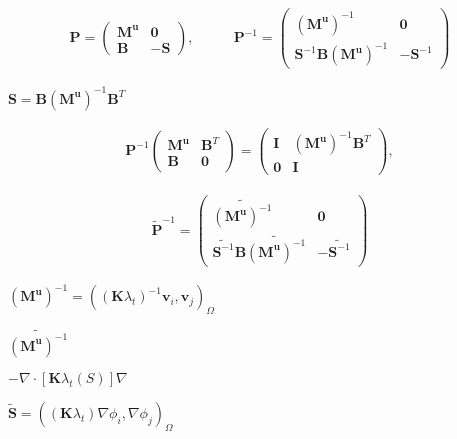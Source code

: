 \documentclass{article}
\begin{document}
\begin{align*} \mathbf{P} = \left( \begin{array}{cc} \mathbf{M}^{\mathbf{u}} & \mathbf{0} \\ \mathbf{B} & -\mathbf{S} \end{array} \right), & \qquad \mathbf{P}^{-1} = \left( \begin{array}{cc} \left(\mathbf{M}^{\mathbf{u}}\right)^{-1} & \mathbf{0} \\ \mathbf{S}^{-1} \mathbf{B} \left(\mathbf{M}^{\mathbf{u}}\right)^{-1} & -\mathbf{S}^{-1} \end{array} \right) \end{align*}
\pagebreak

$\mathbf{S}=\mathbf{B}\left(\mathbf{M}^{\mathbf{u}}\right)^{-1}\mathbf{B}^T$
\pagebreak

\begin{align*} \mathbf{P}^{-1} \left( \begin{array}{cc} \mathbf{M}^{\mathbf{u}} & \mathbf{B}^{T} \\ \mathbf{B} & \mathbf{0} \end{array} \right) = \left( \begin{array}{cc} \mathbf{I} & \left(\mathbf{M}^{\mathbf{u}}\right)^{-1} \mathbf{B}^{T} \\ \mathbf{0} & \mathbf{I} \end{array} \right), \end{align*}
\pagebreak

\begin{align*} \mathbf{\tilde{P}}^{-1} = \left( \begin{array}{cc} \widetilde{\left(\mathbf{{M}}^{\mathbf{u}}\right)^{-1}} & \mathbf{0} \\ \widetilde{\mathbf{{S}}^{-1}} \mathbf{B} \widetilde{\left(\mathbf{{M}}^{\mathbf{u}}\right)^{-1}} & -\widetilde{\mathbf{{S}}^{-1}} \end{array} \right) \end{align*}
\pagebreak

$\left(\mathbf{{M}}^{\mathbf{u}}\right)^{-1}=\left( \left( \mathbf{K} \lambda_t \right)^{-1} \mathbf{v}_{i},\mathbf{v}_{j}\right)_{\Omega}$
\pagebreak

$\widetilde{\left(\mathbf{{M}}^{\mathbf{u}}\right)^{-1}}$
\pagebreak

$-\nabla \cdot [\mathbf K \lambda_t(S)]\nabla$
\pagebreak

$\mathbf{\tilde {S}} = \left( \left( \mathbf{K} \lambda_t \right) \nabla \phi_{i},\nabla \phi_{j}\right)_{\Omega}$
\pagebreak
\end{document}
